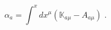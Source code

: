 \begin{equation}
\label{e4:48}
\alpha_a=\int^xdx^{\mu}({\mathbb{K}}_{a \mu}-A_{a \mu}) \;.
\end{equation} 
